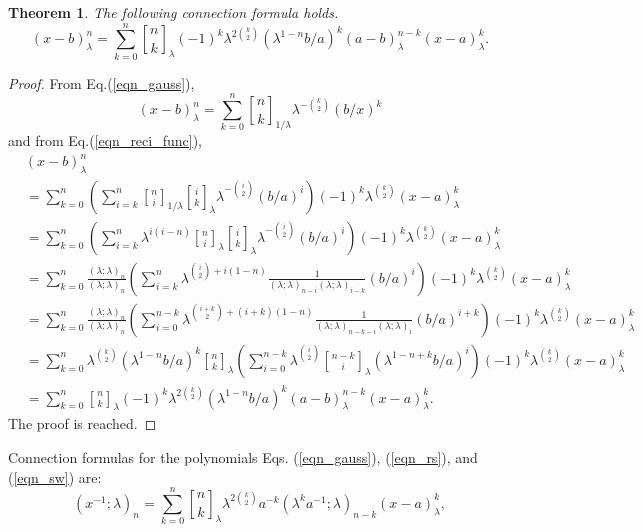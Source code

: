 \documentclass[12pt]{article}
\newcommand{\qbinom}{\genfrac{[}{]}{0pt}{}}
\newtheorem{theorem}{Theorem}
\begin{document}
\begin{theorem}
The following connection formula holds.
    \begin{equation}
        (x-b)_{\lambda}^n=\sum_{k=0}^{n}\qbinom{n}{k}_{\lambda}(-1)^k\lambda^{2\binom{k}{2}}(\lambda^{1-n}b/a)^k(a-b)_{\lambda}^{n-k}(x-a)_{\lambda}^k.
    \end{equation}
\end{theorem}
\begin{proof}
From Eq.(\ref{eqn_gauss}), 
\begin{equation}
    (x-b)_{\lambda}^n=\sum_{k=0}^{n}\qbinom{n}{k}_{1/\lambda}\lambda^{-\binom{k}{2}}(b/x)^k
\end{equation}
and from Eq.(\ref{eqn_reci_func}), 
\begin{align*}
    &(x-b)_{\lambda}^n\\
    &=\sum_{k=0}^{n}\left(\sum_{i=k}^{n}\qbinom{n}{i}_{1/\lambda}\qbinom{i}{k}_{\lambda}\lambda^{-\binom{i}{2}}(b/a)^i\right)(-1)^{k}\lambda^{\binom{k}{2}}(x-a)_{\lambda}^k\\
    &=\sum_{k=0}^{n}\left(\sum_{i=k}^{n}\lambda^{i(i-n)}\qbinom{n}{i}_{\lambda}\qbinom{i}{k}_{\lambda}\lambda^{-\binom{i}{2}}(b/a)^i\right)(-1)^{k}\lambda^{\binom{k}{2}}(x-a)_{\lambda}^k\\
    &=\sum_{k=0}^{n}\frac{(\lambda;\lambda)_{n}}{(\lambda;\lambda)_{n}}\left(\sum_{i=k}^{n}\lambda^{\binom{i}{2}+i(1-n)}\frac{1}{(\lambda;\lambda)_{n-i}(\lambda;\lambda)_{i-k}}(b/a)^i\right)(-1)^{k}\lambda^{\binom{k}{2}}(x-a)_{\lambda}^k\\
    &=\sum_{k=0}^{n}\frac{(\lambda;\lambda)_{n}}{(\lambda;\lambda)_{n}}\left(\sum_{i=0}^{n-k}\lambda^{\binom{i+k}{2}+(i+k)(1-n)}\frac{1}{(\lambda;\lambda)_{n-k-i}(\lambda;\lambda)_{i}}(b/a)^{i+k}\right)(-1)^{k}\lambda^{\binom{k}{2}}(x-a)_{\lambda}^k\\
    &=\sum_{k=0}^{n}\lambda^{\binom{k}{2}}(\lambda^{1-n}b/a)^k\qbinom{n}{k}_{\lambda}\left(\sum_{i=0}^{n-k}\lambda^{\binom{i}{2}}\qbinom{n-k}{i}_{\lambda}(\lambda^{1-n+k}b/a)^{i}\right)(-1)^{k}\lambda^{\binom{k}{2}}(x-a)_{\lambda}^k\\
    &=\sum_{k=0}^{n}\qbinom{n}{k}_{\lambda}(-1)^{k}\lambda^{2\binom{k}{2}}(\lambda^{1-n}b/a)^k(a-b)_{\lambda}^{n-k}(x-a)_{\lambda}^k.
\end{align*}
The proof is reached.
\end{proof}
Connection formulas for the polynomials Eqs. (\ref{eqn_gauss}), (\ref{eqn_rs}), and (\ref{eqn_sw}) are:
\begin{equation}
    (x^{-1};\lambda)_{n}=\sum_{k=0}^{n}\qbinom{n}{k}_{\lambda}\lambda^{2\binom{k}{2}}a^{-k}(\lambda^{k}a^{-1};\lambda)_{n-k}(x-a)_{\lambda}^k,
\end{equation}
\end{document}
